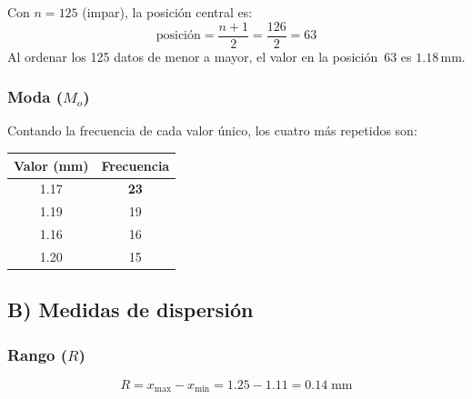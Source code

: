 Con $n = 125$ (impar), la posici\'on central es:
\[
\text{posici\'on} = \frac{n+1}{2} = \frac{126}{2} = 63
\]
Al ordenar los 125 datos de menor a mayor, el valor en la posici\'on~63 es
$1.18\,\text{mm}$.


\subsubsection*{Moda ($M_o$)}

Contando la frecuencia de cada valor \'unico, los cuatro m\'as repetidos son:

\begin{center}
\begin{tabular}{cc}
\toprule
\rowcolor{azulclaro}
\textbf{Valor (mm)} & \textbf{Frecuencia} \\
\midrule
1.17 & \textbf{23} \\
\rowcolor{grisclaro} 1.19 & 19 \\
1.16 & 16 \\
\rowcolor{grisclaro} 1.20 & 15 \\
\bottomrule
\end{tabular}
\end{center}

\resultado[$M_o$ -- Moda]{\[ M_o = 1.17\;\text{mm} \quad \text{(aparece 23 veces)} \]}


\subsection{B) Medidas de dispersi\'on}

\subsubsection*{Rango ($R$)}

\[
R = x_{\max} - x_{\min} = 1.25 - 1.11 = 0.14\;\text{mm}
\]

